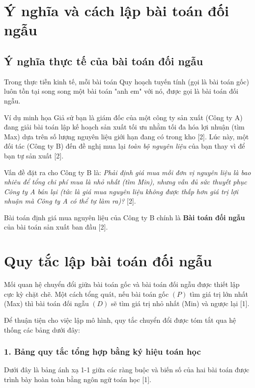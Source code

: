 
\section{Ý nghĩa và cách lập bài toán đối ngẫu}

\subsection{Ý nghĩa thực tế của bài toán đối ngẫu}
Trong thực tiễn kinh tế, mỗi bài toán Quy hoạch tuyến tính (gọi là bài toán gốc) luôn tồn tại song song một bài toán "anh em" với nó, được gọi là bài toán đối ngẫu. 

\begin{exampleblock}{Ví dụ minh họa}
Giả sử bạn là giám đốc của một công ty sản xuất (Công ty A) đang giải bài toán lập kế hoạch sản xuất tối ưu nhằm tối đa hóa lợi nhuận (tìm Max) dựa trên số lượng nguyên liệu giới hạn đang có trong kho [2]. Lúc này, một đối tác (Công ty B) đến đề nghị mua lại \textit{toàn bộ nguyên liệu} của bạn thay vì để bạn tự sản xuất [2].

Vấn đề đặt ra cho Công ty B là: \textit{Phải định giá mua mỗi đơn vị nguyên liệu là bao nhiêu để tổng chi phí mua là nhỏ nhất (tìm Min), nhưng vẫn đủ sức thuyết phục Công ty A bán lại (tức là giá mua nguyên liệu không được thấp hơn giá trị lợi nhuận mà Công ty A có thể tự làm ra)?} [2].

Bài toán định giá mua nguyên liệu của Công ty B chính là \textbf{Bài toán đối ngẫu} của bài toán sản xuất ban đầu [2].
\end{exampleblock}

\section{Quy tắc lập bài toán đối ngẫu}

Mối quan hệ chuyển đổi giữa bài toán gốc và bài toán đối ngẫu được thiết lập cực kỳ chặt chẽ. Một cách tổng quát, nếu bài toán gốc $(P)$ tìm giá trị lớn nhất (Max) thì bài toán đối ngẫu $(D)$ sẽ tìm giá trị nhỏ nhất (Min) và ngược lại [1]. 

Để thuận tiện cho việc lập mô hình, quy tắc chuyển đổi được tóm tắt qua hệ thống các bảng dưới đây:

\subsubsection{1. Bảng quy tắc tổng hợp bằng ký hiệu toán học}
Dưới đây là bảng ánh xạ 1-1 giữa các ràng buộc và biến số của hai bài toán được trình bày hoàn toàn bằng ngôn ngữ toán học [1].

